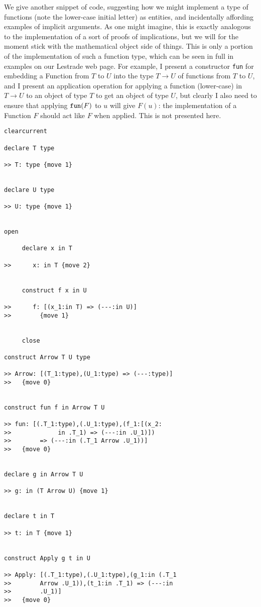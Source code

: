 \documentclass{article}
\begin{document}
 We give another snippet of code, suggesting how we might implement a type of functions (note the lower-case initial letter) as entities, and incidentally affording examples of implicit arguments.  As one might imagine, this is exactly analogous to the implementation of a sort of proofs of implications, but we will for the moment stick with the mathematical object side of things.  This is only a portion of the implementation of such a function type, which can be seen in full in examples on our Lestrade web page.  For example, I present a constructor {\tt fun} for embedding a Function from $T$ to $U$ into the type $T \rightarrow U$ of functions from $T$ to $U$, and I present an application operation for applying a function (lower-case) in $T \rightarrow U$ to an object of type $T$ to get an object of type $U$, but clearly I also need to ensure that applying ${\tt fun}(F)$ to $u$ will give $F(u)$:  the  implementation of a Function $F$ should act like $F$ when applied.  This is not presented here.
\begin{verbatim}
clearcurrent

declare T type

>> T: type {move 1}


declare U type

>> U: type {move 1}


open

     declare x in T

>>      x: in T {move 2}


     construct f x in U

>>      f: [(x_1:in T) => (---:in U)]
>>        {move 1}


     close

construct Arrow T U type

>> Arrow: [(T_1:type),(U_1:type) => (---:type)]
>>   {move 0}


construct fun f in Arrow T U

>> fun: [(.T_1:type),(.U_1:type),(f_1:[(x_2:
>>             in .T_1) => (---:in .U_1)])
>>        => (---:in (.T_1 Arrow .U_1))]
>>   {move 0}


declare g in Arrow T U

>> g: in (T Arrow U) {move 1}


declare t in T

>> t: in T {move 1}


construct Apply g t in U

>> Apply: [(.T_1:type),(.U_1:type),(g_1:in (.T_1 
>>        Arrow .U_1)),(t_1:in .T_1) => (---:in 
>>        .U_1)]
>>   {move 0}


\end{verbatim}
\end{document}
